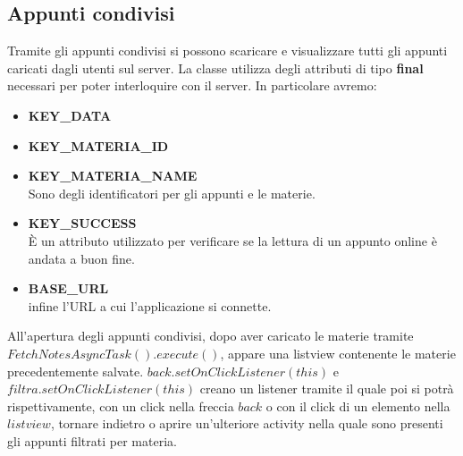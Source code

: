 \documentclass[a4paper, 50pt, twoside]{article}
\begin{document}
\newpage
\subsection{Appunti condivisi}
Tramite gli appunti condivisi si possono scaricare e visualizzare tutti gli appunti caricati dagli utenti sul server. La classe utilizza degli attributi di tipo \textbf{final} necessari per poter interloquire con il server. In particolare avremo:\\
\begin{itemize}
\item \textbf{KEY\_DATA}
\item \textbf{KEY\_MATERIA\_ID}
\item \textbf{KEY\_MATERIA\_NAME}
\\Sono degli identificatori per gli appunti e le materie.\\
\item  \textbf{KEY\_SUCCESS}
\\È un attributo utilizzato per verificare se la lettura di un appunto online è andata a buon fine.
\item \textbf{BASE\_URL}
\\infine l'URL a cui l'applicazione si connette.
\end{itemize}
 All'apertura degli appunti condivisi, dopo aver caricato le materie tramite $FetchNotesAsyncTask().execute()$, appare una listview contenente le materie precedentemente salvate. $back.setOnClickListener(this)$ e $filtra.setOnClickListener(this)$ creano un listener tramite il quale poi si potrà rispettivamente, con  un click nella freccia \textbf{$back$} o con il click di un elemento nella $listview$, tornare indietro o aprire un'ulteriore activity nella quale sono presenti gli appunti filtrati per materia.
\end{document}
